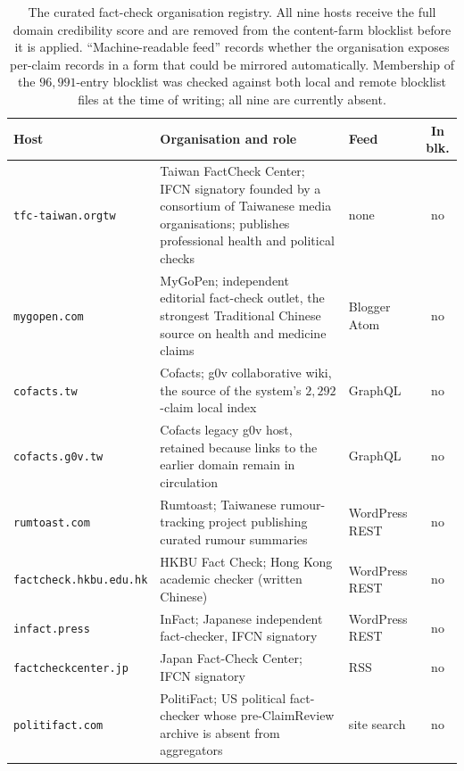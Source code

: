 \documentclass[twoside]{llncs}
\begin{document}
\begin{table}[!htbp]
\caption{The curated fact-check organisation registry. All nine hosts receive the full domain credibility score and are removed from the content-farm blocklist before it is applied. ``Machine-readable feed'' records whether the organisation exposes per-claim records in a form that could be mirrored automatically. Membership of the $96{,}991$-entry blocklist was checked against both local and remote blocklist files at the time of writing; all nine are currently absent.}
\label{tab:registry}
\centering
\small
\begin{tabular}{>{\raggedright\arraybackslash}p{2.7cm} >{\raggedright\arraybackslash}p{5.6cm} >{\raggedright\arraybackslash}p{1.9cm}c}
\toprule
\textbf{Host} & \textbf{Organisation and role} & \textbf{Feed} & \textbf{In blk.} \\
\midrule
\texttt{tfc-taiwan.org\allowbreak tw} & Taiwan FactCheck Center; IFCN signatory founded by a consortium of Taiwanese media organisations; publishes professional health and political checks & none & no \\
\texttt{mygopen.com} & MyGoPen; independent editorial fact-check outlet, the strongest Traditional Chinese source on health and medicine claims & Blogger Atom & no \\
\texttt{cofacts.tw} & Cofacts; g0v collaborative wiki, the source of the system's $2{,}292$-claim local index & GraphQL & no \\
\texttt{cofacts.g0v.tw} & Cofacts legacy g0v host, retained because links to the earlier domain remain in circulation & GraphQL & no \\
\texttt{rumtoast.com} & Rumtoast; Taiwanese rumour-tracking project publishing curated rumour summaries & WordPress REST & no \\
\texttt{factcheck.\allowbreak hkbu.edu.hk} & HKBU Fact Check; Hong Kong academic checker (written Chinese) & WordPress REST & no \\
\texttt{infact.press} & InFact; Japanese independent fact-checker, IFCN signatory & WordPress REST & no \\
\texttt{factcheckcenter.\allowbreak jp} & Japan Fact-Check Center; IFCN signatory & RSS & no \\
\texttt{politifact.com} & PolitiFact; US political fact-checker whose pre-ClaimReview archive is absent from aggregators & site search & no \\
\bottomrule
\end{tabular}
\end{table}
\end{document}
